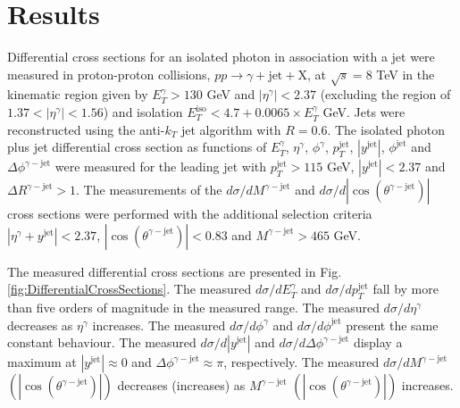 \documentclass[12pt, twoside]{article}
\numberwithin{equation}{section}
\numberwithin{figure}{section}
\begin{document}
%
%
\newpage
\thispagestyle{empty}
\section{Results}
\label{sec:Results}
\vspace{1.0cm}

Differential cross sections for an isolated photon in association with a jet were measured in proton-proton collisions, $pp \rightarrow{} \gamma + \text{jet} + \text{X}$, at $\sqrt{s} = 8$ TeV in the kinematic region given by $E^{\gamma}_{T} > 130$ GeV and $\left| \eta^{\gamma} \right| < 2.37$ (excluding the region of $1.37 < \left| \eta^{\gamma} \right| < 1.56$) and isolation $E^{\text{iso}}_{T} < 4.7 + 0.0065 \times E^{\gamma}_{T}$ GeV. Jets were reconstructed using the anti-$k_{T}$ jet algorithm with $R = 0.6$. The isolated photon plus jet differential cross section as functions of $E^{\gamma}_{T}$, $\eta^{\gamma}$, $\phi^{\gamma}$, $p^{\text{jet}}_{T}$, $\left| y^{\text{jet}} \right|$, $\phi^{\text{jet}}$ and $\Delta \phi^{\gamma-\text{jet}}$ were measured for the leading jet with $p^{\text{jet}}_{T} > 115$ GeV, $\left| y^{\text{jet}} \right| < 2.37$ and $\Delta R^{\gamma-\text{jet}} > 1$. The measurements of the $d \sigma / d M^{\gamma-\text{jet}}$ and $d \sigma / d \left| \cos \left( \theta^{\gamma-\text{jet}} \right) \right|$ cross sections were performed with the additional selection criteria $\left| \eta^{\gamma} + y^{\text{jet}} \right| < 2.37$, $\left| \cos \left( \theta^{\gamma-\text{jet}} \right) \right| < 0.83$ and $M^{\gamma-\text{jet}} > 465$ GeV.

The measured differential cross sections are presented in Fig.\,\ref{fig:DifferentialCrossSections}. The measured $d \sigma / d E^{\gamma}_{T}$ and $d \sigma / d p^{\text{jet}}_{T}$ fall by more than five orders of magnitude in the measured range. The measured $d \sigma / d \eta^{\gamma}$ decreases as $\eta^{\gamma}$ increases. The measured $d \sigma / d \phi^{\gamma}$ and $d \sigma / d \phi^{\text{jet}}$ present the same constant behaviour. The measured $d \sigma / d \left| y^{\text{jet}} \right|$ and $d \sigma / d \Delta \phi^{\gamma-\text{jet}}$ display a maximum at $\left| y^{\text{jet}} \right| \approx 0$ and $\Delta \phi^{\gamma-\text{jet}} \approx \pi$, respectively. The measured $d \sigma / d M^{\gamma-\text{jet}}$ $\left( \left| \cos \left( \theta^{\gamma-\text{jet}} \right) \right| \right)$ decreases (increases) as $M^{\gamma-\text{jet}}$ $\left( \left| \cos \left( \theta^{\gamma-\text{jet}} \right) \right| \right)$ increases.
\end{document}
